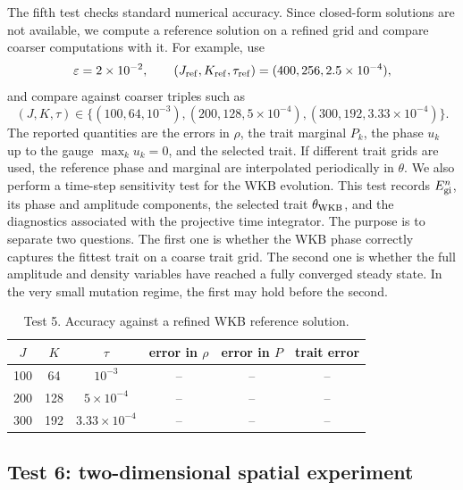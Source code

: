 \documentclass[11pt]{article}
\begin{document}
The fifth test checks standard numerical accuracy.  Since closed-form solutions are not available, we compute a reference solution on a refined grid and compare coarser computations with it.  For example, use
\[
    \varepsilon=2\times10^{-2},
    \qquad
    (J_{\rm ref},K_{\rm ref},\tau_{\rm ref})=(400,256,2.5\times10^{-4}),
\]
and compare against coarser triples such as
\[
    (J,K,\tau)\in
    \{(100,64,10^{-3}), (200,128,5\times10^{-4}), (300,192,3.33\times10^{-4})\}.
\]
The reported quantities are the errors in \(\rho\), the trait marginal \(P_k\), the phase \(u_k\) up to the gauge \(\max_k u_k=0\), and the selected trait.  If different trait grids are used, the reference phase and marginal are interpolated periodically in \(\theta\). {\color{red} We also perform a time-step sensitivity test for the WKB evolution.  This test records \(E^n_{\rm gi}\), its phase and amplitude components, the selected trait \(\theta_{\rm WKB}\), and the diagnostics associated with the projective time integrator.  The purpose is to separate two questions.  The first one is whether the WKB phase correctly captures the fittest trait on a coarse trait grid.  The second one is whether the full amplitude and density variables have reached a fully converged steady state.  In the very small mutation regime, the first may hold before the second.}

\begin{table}[ht]
\centering
\caption{Test 5. Accuracy against a refined WKB reference solution.}
\begin{tabular}{cccccc}
\toprule
$J$ & $K$ & $\tau$ & error in $\rho$ & error in $P$ & trait error\\
\midrule
100 & 64 & $10^{-3}$ & -- & -- & --\\
200 & 128 & $5\times10^{-4}$ & -- & -- & --\\
300 & 192 & $3.33\times10^{-4}$ & -- & -- & --\\
\bottomrule
\end{tabular}
\end{table}

\subsection{Test 6: two-dimensional spatial experiment}\label{subsec:test_2d_new}
\end{document}
